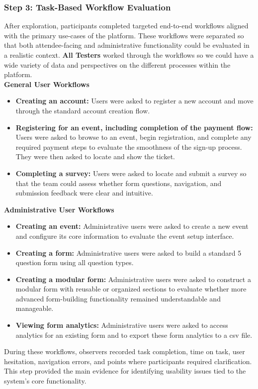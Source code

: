 \documentclass[12pt]{article}
\begin{document}
\subsubsection{Step 3: Task-Based Workflow Evaluation}
After exploration, participants completed targeted end-to-end workflows aligned with the primary use-cases of the platform. These workflows were separated so that both attendee-facing and administrative functionality could be evaluated in a realistic context. \textbf{All Testers} worked through the workflows so we could have a wide variety of data and perspectives on the different processes within the platform.\\
\textbf{General User Workflows}
\begin{itemize}
    \item \textbf{Creating an account:} Users were asked to register a new account and move through the standard account creation flow.
    \item \textbf{Registering for an event, including completion of the payment flow:} Users were asked to browse to an event, begin registration, and complete any required payment steps to evaluate the smoothness of the sign-up process. They were then asked to locate and show the ticket.
    \item \textbf{Completing a survey:} Users were asked to locate and submit a survey so that the team could assess whether form questions, navigation, and submission feedback were clear and intuitive.
\end{itemize}
\textbf{Administrative User Workflows}
\begin{itemize}
    \item \textbf{Creating an event:} Administrative users were asked to create a new event and configure its core information to evaluate the event setup interface.
    \item \textbf{Creating a form:} Administrative users were asked to build a standard 5 question form using all question types.
    \item \textbf{Creating a modular form:} Administrative users were asked to construct a modular form with reusable or organized sections to evaluate whether more advanced form-building functionality remained understandable and manageable.
    \item \textbf{Viewing form analytics:} Administrative users were asked to access analytics for an existing form and to export these form analytics to a csv file.
\end{itemize}
During these workflows, observers recorded task completion, time on task, user hesitation, navigation errors, and points where participants required clarification. This step provided the main evidence for identifying usability issues tied to the system's core functionality.
\end{document}
